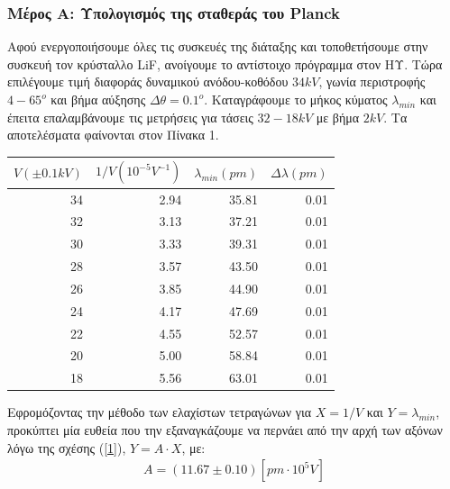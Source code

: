 \documentclass[a4paper]{article}
\begin{document}
\subsubsection*{Μέρος Α: Υπολογισμός της σταθεράς του Planck}
	Αφού ενεργοποιήσουμε όλες τις συσκευές της διάταξης και τοποθετήσουμε στην συσκευή τον κρύσταλλο LiF, ανοίγουμε το αντίστοιχο πρόγραμμα στον ΗΥ. Τώρα επιλέγουμε τιμή διαφοράς δυναμικού ανόδου-κοθόδου $34kV$, γωνία περιστροφής $4-65^o$ και βήμα αύξησης $\Delta\theta=0.1^o$. Καταγράφουμε το μήκος κύματος $\lambda_{min}$ και έπειτα επαλαμβάνουμε τις μετρήσεις για τάσεις $32-18kV$ με βήμα $2kV$. Τα αποτελέσματα φαίνονται στον Πίνακα 1. 
	\begin{table}[h!]
		\centering
		\begin{tabular}{r|r|r|r}
		$V(\pm0.1kV)$ & $1/V(10^{-5}V^{-1})$ & $\lambda_{min}(pm)$ & $\Delta\lambda (pm)$ \\ 
		\hline\hline
		34&2.94&35.81&0.01\\
		32&3.13&37.21&0.01\\
		30&3.33&39.31&0.01\\
		28&3.57&43.50&0.01\\
		26&3.85&44.90&0.01\\
		24&4.17&47.69&0.01\\
		22&4.55&52.57&0.01\\
		20&5.00&58.84&0.01\\
		18&5.56&63.01&0.01
		\end{tabular}
	\end{table}
	
	Εφρομόζοντας την μέθοδο των ελαχίστων τετραγώνων για $X=1/V$ και $Y = \lambda_{min}$, προκύπτει μία ευθεία που την εξαναγκάζουμε να περνάει από την αρχή των αξόνων λόγω της σχέσης (\ref{1}), $Y=A\cdot X$, με: 
	\begin{align}
		A = ( 11.67 \pm 0.10) [pm\cdot10^5V]
	\end{align}
	
\end{document}
